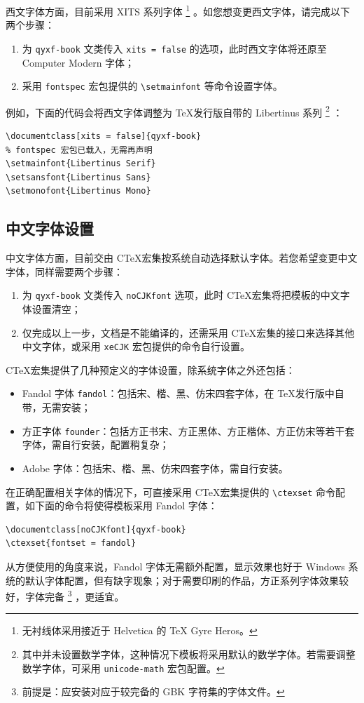 \documentclass[
  xits = false,
  10pt,
  twoside,
  openany,
  b5paper, %
  colorscheme = basic %
]{qyxf-book}
\begin{document}
西文字体方面，目前采用 XITS 系列字体
\footnote{无衬线体采用接近于 Helvetica 的 \TeX{} Gyre Heros。}
。如您想变更西文字体，请完成以下两个步骤：

\begin{enumerate}
  \item 为 \verb|qyxf-book| 文类传入 \verb|xits = false| 的选项，此时西文字体将还原至 Computer Modern 字体；
  \item 采用 \verb|fontspec| 宏包提供的 \verb|\setmainfont| 等命令设置字体。
\end{enumerate}

例如，下面的代码会将西文字体调整为 \TeX 发行版自带的 Libertinus 系列
\footnote{其中并未设置数学字体，这种情况下模板将采用默认的数学字体。若需要调整数学字体，可采用 \texttt{unicode-math} 宏包配置。}
：

\begin{tcolorbox}
\begin{verbatim}
\documentclass[xits = false]{qyxf-book}
% fontspec 宏包已载入，无需再声明
\setmainfont{Libertinus Serif}
\setsansfont{Libertinus Sans}
\setmonofont{Libertinus Mono}
\end{verbatim}
\end{tcolorbox}

\subsection{中文字体设置}

中文字体方面，目前交由 C\TeX 宏集按系统自动选择默认字体。若您希望变更中文字体，同样需要两个步骤：
\begin{enumerate}
  \item 为 \verb|qyxf-book| 文类传入 \verb|noCJKfont| 选项，此时 C\TeX 宏集将把模板的中文字体设置清空；
  \item 仅完成以上一步，文档是不能编译的，还需采用 C\TeX 宏集的接口来选择其他中文字体，或采用 \verb|xeCJK| 宏包提供的命令自行设置。
\end{enumerate}

C\TeX 宏集提供了几种预定义的字体设置，除系统字体之外还包括：
\begin{itemize}
  \item Fandol 字体 \verb|fandol|：包括宋、楷、黑、仿宋四套字体，在 \TeX 发行版中自带，无需安装；
  \item 方正字体 \verb|founder|：包括方正书宋、方正黑体、方正楷体、方正仿宋等若干套字体，需自行安装，配置稍复杂；
  \item Adobe 字体：包括宋、楷、黑、仿宋四套字体，需自行安装。
\end{itemize}
在正确配置相关字体的情况下，可直接采用 C\TeX 宏集提供的 \verb|\ctexset| 命令配置，如下面的命令将使得模板采用 Fandol 字体：
\begin{tcolorbox}
\begin{verbatim}
\documentclass[noCJKfont]{qyxf-book}
\ctexset{fontset = fandol}
\end{verbatim}
\end{tcolorbox}
从方便使用的角度来说，Fandol 字体无需额外配置，显示效果也好于 Windows 系统的默认字体配置，但有缺字现象；对于需要印刷的作品，方正系列字体效果较好，字体完备
\footnote{前提是：应安装对应于较完备的 GBK 字符集的字体文件。}
，更适宜。
\end{document}
